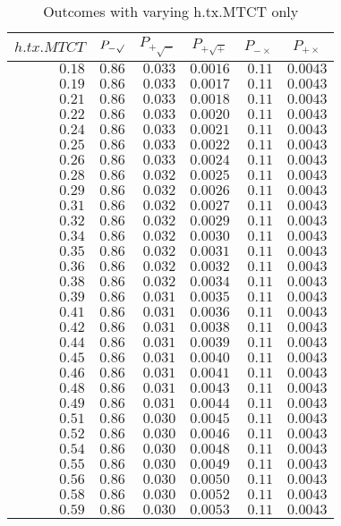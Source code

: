 %
\begin{table}[\hbtp]
 \small
 \begin{center}
 \begin{tabular}{rrrrrr}\hline\hline
\multicolumn{1}{c}{$h.tx.MTCT$}&\multicolumn{1}{c}{$P_{-\surd}$}&\multicolumn{1}{c}{$P_{+\surd - }$}&\multicolumn{1}{c}{$P_{+\surd +}$}&\multicolumn{1}{c}{$P_{-\times}$}&\multicolumn{1}{c}{$P_{+\times}$}\tabularnewline
\hline
$0.18$&$0.86$&$0.033$&$0.0016$&$0.11$&$0.0043$\tabularnewline
$0.19$&$0.86$&$0.033$&$0.0017$&$0.11$&$0.0043$\tabularnewline
$0.21$&$0.86$&$0.033$&$0.0018$&$0.11$&$0.0043$\tabularnewline
$0.22$&$0.86$&$0.033$&$0.0020$&$0.11$&$0.0043$\tabularnewline
$0.24$&$0.86$&$0.033$&$0.0021$&$0.11$&$0.0043$\tabularnewline
$0.25$&$0.86$&$0.033$&$0.0022$&$0.11$&$0.0043$\tabularnewline
$0.26$&$0.86$&$0.033$&$0.0024$&$0.11$&$0.0043$\tabularnewline
$0.28$&$0.86$&$0.032$&$0.0025$&$0.11$&$0.0043$\tabularnewline
$0.29$&$0.86$&$0.032$&$0.0026$&$0.11$&$0.0043$\tabularnewline
$0.31$&$0.86$&$0.032$&$0.0027$&$0.11$&$0.0043$\tabularnewline
$0.32$&$0.86$&$0.032$&$0.0029$&$0.11$&$0.0043$\tabularnewline
$0.34$&$0.86$&$0.032$&$0.0030$&$0.11$&$0.0043$\tabularnewline
$0.35$&$0.86$&$0.032$&$0.0031$&$0.11$&$0.0043$\tabularnewline
$0.36$&$0.86$&$0.032$&$0.0032$&$0.11$&$0.0043$\tabularnewline
$0.38$&$0.86$&$0.032$&$0.0034$&$0.11$&$0.0043$\tabularnewline
$0.39$&$0.86$&$0.031$&$0.0035$&$0.11$&$0.0043$\tabularnewline
$0.41$&$0.86$&$0.031$&$0.0036$&$0.11$&$0.0043$\tabularnewline
$0.42$&$0.86$&$0.031$&$0.0038$&$0.11$&$0.0043$\tabularnewline
$0.44$&$0.86$&$0.031$&$0.0039$&$0.11$&$0.0043$\tabularnewline
$0.45$&$0.86$&$0.031$&$0.0040$&$0.11$&$0.0043$\tabularnewline
$0.46$&$0.86$&$0.031$&$0.0041$&$0.11$&$0.0043$\tabularnewline
$0.48$&$0.86$&$0.031$&$0.0043$&$0.11$&$0.0043$\tabularnewline
$0.49$&$0.86$&$0.031$&$0.0044$&$0.11$&$0.0043$\tabularnewline
$0.51$&$0.86$&$0.030$&$0.0045$&$0.11$&$0.0043$\tabularnewline
$0.52$&$0.86$&$0.030$&$0.0046$&$0.11$&$0.0043$\tabularnewline
$0.54$&$0.86$&$0.030$&$0.0048$&$0.11$&$0.0043$\tabularnewline
$0.55$&$0.86$&$0.030$&$0.0049$&$0.11$&$0.0043$\tabularnewline
$0.56$&$0.86$&$0.030$&$0.0050$&$0.11$&$0.0043$\tabularnewline
$0.58$&$0.86$&$0.030$&$0.0052$&$0.11$&$0.0043$\tabularnewline
$0.59$&$0.86$&$0.030$&$0.0053$&$0.11$&$0.0043$\tabularnewline
\hline
\end{tabular}

\end{center}

\caption{Outcomes with varying h.tx.MTCT only\label{tbl:h.tx.MTCT_varying_only}} 

\end{table}

